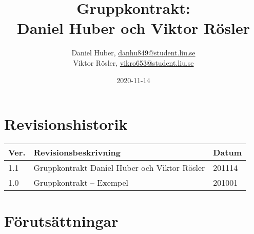 \documentclass{mall}
\author{Daniel Huber, \url{danhu849@student.liu.se}\\
  Viktor Rösler, \url{vikro653@student.liu.se}\\
  }
\title{Gruppkontrakt:\\ Daniel Huber och Viktor Rösler}
\date{2020-11-14}
\begin{document}
\projectpage

\section{Revisionshistorik}
\begin{table}[!h]
\begin{tabularx}{\linewidth}{|l|X|l|}
\hline
Ver. & Revisionsbeskrivning & Datum \\\hline
1.1 & Gruppkontrakt Daniel Huber och Viktor Rösler & 201114 \\\hline
1.0 & Gruppkontrakt -- Exempel & 201001 \\\hline
\end{tabularx}
\end{table}

\section{Förutsättningar}
\label{prereq}
\end{document}
